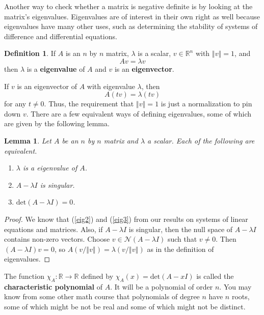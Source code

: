 \documentclass[12pt,reqno]{amsart}
\newtheorem{lemma}{Lemma}[section]
\theoremstyle{definition}
\newtheorem{definition}{Definition}[section]
\def\R{\mathbb{R}}
\newcommand{\norm}[1]{\left\Vert {#1} \right\Vert}
\renewcommand{\det}{\mathrm{det}}
\renewcommand{\to}{{\rightarrow}}
\begin{document}
Another way to check whether a matrix is negative definite is by
looking at the matrix's eigenvalues. Eigenvalues are of interest in
their own right as well because eigenvalues have many other uses, such
as determining the stability of systems of difference and differential
equations. 
\begin{definition}
  If $A$ is an $n$ by $n$ matrix, $\lambda$ is a scalar, $v \in \R^n$
  with $\norm{v} = 1$, 
  and 
  \[ Av = \lambda v \]
  then $\lambda$ is a \textbf{eigenvalue} of $A$ and $v$ is an
  \textbf{eigenvector}. 
\end{definition}
If $v$ is an eigenvector of $A$ with eigenvalue $\lambda$, then 
\[ A(tv) = \lambda (tv) \]
for any $t \neq 0$. Thus, the requirement that $\norm{v} = 1$ is just
a normalization to pin down $v$. There are a few equivalent ways of
defining eigenvalues, some of which 
are given by the following lemma.
\begin{lemma}
  Let $A$ be an $n$ by $n$ matrix and $\lambda$ a scalar. Each of the
  following are equivalent.
  \begin{enumerate}
  \item\label{eig1} $\lambda$ is a eigenvalue of $A$.
  \item\label{eig2} $A - \lambda I$ is singular.
  \item\label{eig3} $\det(A - \lambda I ) = 0$.
  \end{enumerate}
\end{lemma}
\begin{proof}
  We know that (\ref{eig2}) and (\ref{eig3}) from our results on
  systems of linear equations and matrices. Also, if $A - \lambda I$
  is singular, then the null space of $A - \lambda I$ contains
  non-zero vectors. Choose $v \in \mathcal{N}(A-\lambda I)$ such that
  $v \neq 0$. Then $(A-\lambda I) v = 0$, so $A(v/\norm{v}) =
  \lambda(v/\norm{v})$ as in the definition of eigenvalues. 
\end{proof}
The function $\chi_A:\R\to\R$ defined by $\chi_A(x) = \det(A - x I)$
is called the \textbf{characteristic polynomial} of $A$. It will be a
polynomial of order $n$. You may know from some other math course that
polynomials of degree $n$ have $n$ roots, some of which might be
not be real and some of which might not be distinct. 
\end{document}
